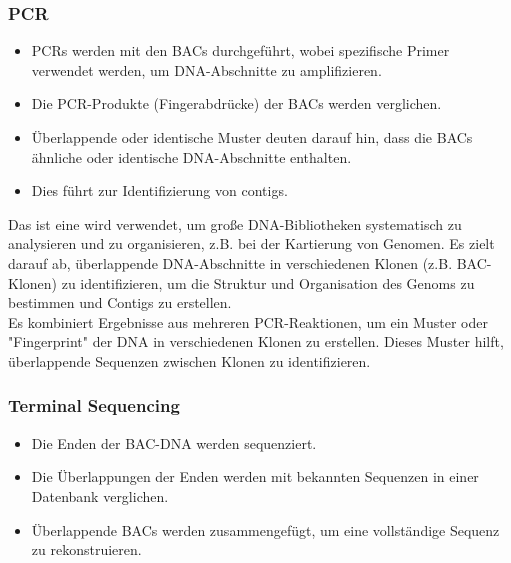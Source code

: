 \subsubsection{PCR}
\begin{itemize}
    \item PCRs werden mit den BACs durchgeführt, wobei spezifische Primer verwendet werden, um DNA-Abschnitte zu amplifizieren.
    \item Die PCR-Produkte (Fingerabdrücke) der BACs werden verglichen.
    \item Überlappende oder identische Muster deuten darauf hin, dass die BACs ähnliche oder identische DNA-Abschnitte enthalten.
    \item Dies führt zur Identifizierung von \glspl{contig}.
\end{itemize}
\begin{mybox}[title=Was hat das mit Kombinatorischem PCR-Marker-Screening zu tun?]
Das ist eine wird verwendet, um große DNA-Bibliotheken systematisch zu analysieren und zu organisieren, z.B. bei der Kartierung von Genomen. Es zielt darauf ab, überlappende DNA-Abschnitte in verschiedenen Klonen (z.B. BAC-Klonen) zu identifizieren, um die Struktur und Organisation des Genoms zu bestimmen und Contigs zu erstellen. \\
Es kombiniert Ergebnisse aus mehreren PCR-Reaktionen, um ein Muster oder "Fingerprint" der DNA in verschiedenen Klonen zu erstellen. Dieses Muster hilft, überlappende Sequenzen zwischen Klonen zu identifizieren.
\end{mybox}
\subsubsection{Terminal Sequencing} 
\begin{itemize}
    \item Die Enden der BAC-DNA werden sequenziert.
    \item Die Überlappungen der Enden werden mit bekannten Sequenzen in einer Datenbank verglichen.
    \item Überlappende BACs werden zusammengefügt, um eine vollständige Sequenz zu rekonstruieren.
\end{itemize}

